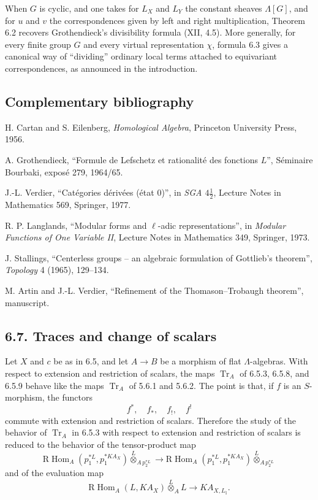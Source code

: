 \documentclass[12pt]{article}
\newcommand{\RHom}{\mathrm R\!\operatorname{Hom}}
\newcommand{\Tr}{\operatorname{Tr}}
\begin{document}
When $G$ is cyclic, and one takes for $L_X$ and $L_Y$ the constant sheaves
$\Lambda[G]$, and for $u$ and $v$ the correspondences given by left and right
multiplication, Theorem 6.2 recovers Grothendieck's divisibility formula (XII, 4.5).
More generally, for every finite group $G$ and every virtual representation $\chi$,
formula 6.3 gives a canonical way of ``dividing'' ordinary local terms attached to
equivariant correspondences, as announced in the introduction.

\subsection*{Complementary bibliography}

\begin{enumerate}[label={[\arabic*]}]
\item H. Cartan and S. Eilenberg, \emph{Homological Algebra}, Princeton University Press, 1956.
\item A. Grothendieck, ``Formule de Lefschetz et rationalité des fonctions $L$'', Séminaire Bourbaki, exposé 279, 1964/65.
\item J.-L. Verdier, ``Catégories dérivées (état 0)'', in \emph{SGA $4\frac12$}, Lecture Notes in Mathematics 569, Springer, 1977.
\item R. P. Langlands, ``Modular forms and $\ell$-adic representations'', in \emph{Modular Functions of One Variable II}, Lecture Notes in Mathematics 349, Springer, 1973.
\item J. Stallings, ``Centerless groups -- an algebraic formulation of Gottlieb's theorem'', \emph{Topology} 4 (1965), 129--134.
\item M. Artin and J.-L. Verdier, ``Refinement of the Thomason--Trobaugh theorem'', manuscript.
\end{enumerate}

\newpage

\subsection*{6.7. Traces and change of scalars}

Let $X$ and $c$ be as in 6.5, and let $A\to B$ be a morphism of flat
$\Lambda$-algebras. With respect to extension and restriction of scalars, the maps
$\Tr_A$ of 6.5.3, 6.5.8, and 6.5.9 behave like the maps $\Tr_A$ of 5.6.1 and
5.6.2. The point is that, if $f$ is an $S$-morphism, the functors
\[
       f^*,\quad f_*,\quad f_!,\quad f^!
\]
commute with extension and restriction of scalars. Therefore the study of the
behavior of $\Tr_A$ in 6.5.3 with respect to extension and restriction of scalars is
reduced to the behavior of the tensor-product map
\[
\RHom_A(p_1^{*L},p_1^{*K A_X})\overset{L}{\otimes}_{A\,p_2^{*L}}
\longrightarrow
\RHom_A(p_1^{*L},p_1^{*K A_X})\overset{L}{\otimes}_{A\,p_2^{*L}}
\]
and of the evaluation map
\[
\RHom_A(L,K A_X)\overset{L}{\otimes}_A L\longrightarrow K A_{X,L_\natural}.
\]
\end{document}
